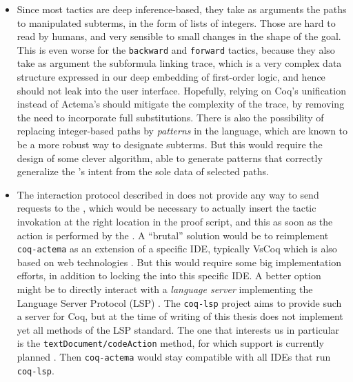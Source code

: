 \begin{itemize}
  \item Since most tactics are deep inference-based, they take as arguments the
  paths to manipulated subterms, in the form of lists of integers. Those are
  hard to read by humans, and very sensible to small changes in the shape of the
  goal. This is even worse for the \texttt{backward} and \texttt{forward}
  tactics, because they also take as argument the subformula linking trace,
  which is a very complex data structure expressed in our deep embedding of
  first-order logic, and hence should not leak into the user interface.
  Hopefully, relying on Coq's unification instead of Actema's should mitigate
  the complexity of the trace, by removing the need to incorporate full
  substitutions. There is also the possibility of replacing integer-based paths
  by \emph{patterns} in the {\ssreflect} language, which are known to be a more
  robust way to designate subterms. But this would require the design of some
  clever algorithm, able to generate patterns that correctly generalize the
  's intent from the sole data of selected paths.

  \item The interaction protocol described in  does not provide
  any way to send requests to the , which would be necessary to
  actually insert the tactic invokation at the right location in the proof
  script, and this as soon as the action is performed by the . A
  ``brutal'' solution would be to reimplement \texttt{coq-actema} as an
  extension of a specific IDE, typically VsCoq which is also based on web
  technologies \cite{VsCoq}. But this would require some big implementation
  efforts, in addition to locking the  into this specific IDE. A
  better option might be to directly interact with a \emph{language server}
  implementing the Language Server Protocol (LSP) \cite{LSP}. The
  \texttt{coq-lsp} project aims to provide such a server for Coq, but at the
  time of writing of this thesis does not implement yet all methods of the LSP
  standard. The one that interests us in particular is the
  \texttt{textDocument/codeAction} method, for which support is currently
  planned \cite{coq-lsp-proto}. Then \texttt{coq-actema} would stay compatible
  with all IDEs that run \texttt{coq-lsp}.
\end{itemize}